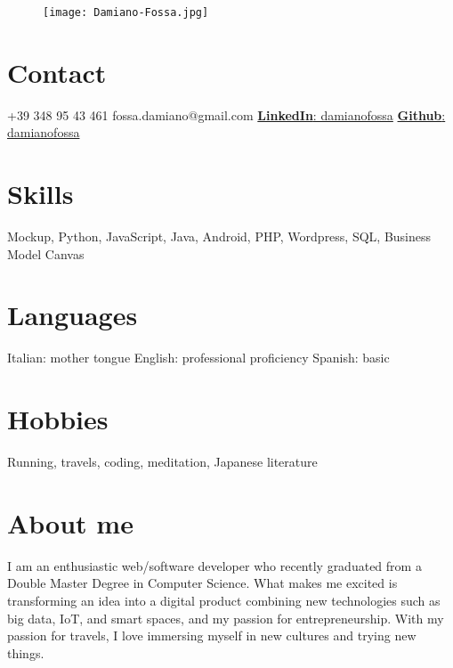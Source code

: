 \documentclass[]{friggeri-cv}
\begin{document}


\begin{aside}
\begin{figure}
\vspace*{0.7cm}
\texttt{[image: Damiano-Fossa.jpg]} 
\end{figure}
\section{Contact}
+39 348 95 43 461
fossa.damiano@gmail.com
\href{https://www.linkedin.com/in/damianofossa/}{\textbf{LinkedIn}: damianofossa}
\href{https://github.com/DamianFox}{\textbf{Github}: damianofossa}
\section{Skills}
Mockup,
Python, JavaScript,
Java, Android, PHP, Wordpress, SQL, Business Model Canvas
\section{Languages}
Italian: mother tongue
English: professional proficiency
Spanish: basic
\section{Hobbies}
Running, travels, coding, 
meditation, Japanese literature
\end{aside}


\section{About me}
{
I am an enthusiastic web/software developer who recently graduated from a Double Master Degree in Computer Science. What makes me excited is transforming an idea into a digital product combining new technologies such as big data, IoT, and smart spaces, and my passion for entrepreneurship. With my passion for travels, I love immersing myself in new cultures and trying new things. \newline
}
\end{document}
